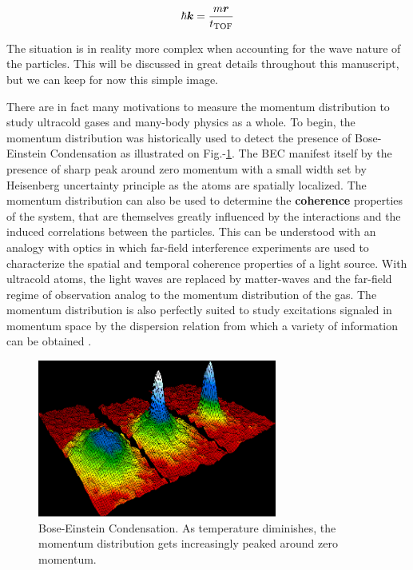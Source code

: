 \begin{equation}
    \hbar \bm{k} = \frac{m \bm{r}}{t_{\rm{TOF}}}
\end{equation}

\noindent The situation is in reality more complex when accounting for the wave nature of the particles. This will be discussed in great details throughout this manuscript, but we can keep for now this simple image.

There are in fact many motivations to measure the momentum distribution to study ultracold gases and many-body physics as a whole. To begin, the momentum distribution was historically used to detect the presence of Bose-Einstein Condensation as illustrated on Fig.-\ref{fig:1st_BEC}. The BEC manifest itself by the presence of sharp peak around zero momentum with a small width set by Heisenberg uncertainty principle as the atoms are spatially localized. The momentum distribution can also be used to determine the \textbf{coherence} properties of the system, that are themselves greatly influenced by the interactions and the induced correlations between the particles. This can be understood with an analogy with optics in which far-field interference experiments are used to characterize the spatial and temporal coherence properties of a light source. With ultracold atoms, the light waves are replaced by matter-waves and the far-field regime of observation analog to the momentum distribution of the gas. The momentum distribution is also perfectly suited to study excitations signaled in momentum space by the dispersion relation from which a variety of information can be obtained .


\begin{figure}
    \centering
    \includegraphics[width=0.7\textwidth]{Fig/Intro/BEC.png}
    \caption[Momentum distribution across Bose-Einstein Condensation]{Bose-Einstein Condensation. As temperature diminishes, the momentum distribution gets increasingly peaked around zero momentum.}
    \label{fig:1st_BEC}
\end{figure}


